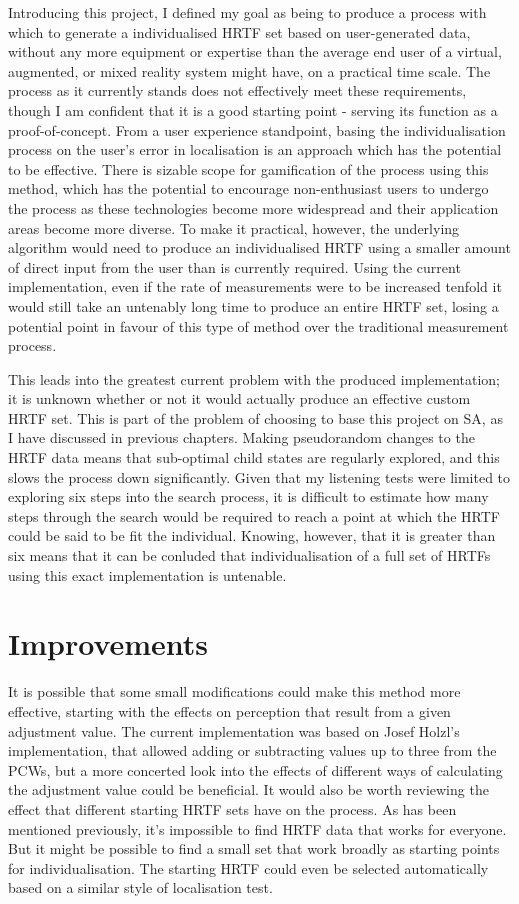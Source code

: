 Introducing this project, I defined my goal as being to produce a process with which to generate a individualised HRTF set based on user-generated data, without any more equipment or expertise than the average end user of a virtual, augmented, or mixed reality system might have, on a practical time scale. The process as it currently stands does not effectively meet these requirements, though I am confident that it is a good starting point - serving its function as a proof-of-concept. From a user experience standpoint, basing the individualisation process on the user's error in localisation is an approach which has the potential to be effective. There is sizable scope for gamification of the process using this method, which has the potential to encourage non-enthusiast users to undergo the process as these technologies become more widespread and their application areas become more diverse. To make it practical, however, the underlying algorithm would need to produce an individualised HRTF using a smaller amount of direct input from the user than is currently required. Using the current implementation, even if the rate of measurements were to be increased tenfold it would still take an untenably long time to produce an entire HRTF set, losing a potential point in favour of this type of method over the traditional measurement process. 

This leads into the greatest current problem with the produced implementation; it is unknown whether or not it would actually produce an effective custom HRTF set. This is part of the problem of choosing to base this project on SA, as I have discussed in previous chapters. Making pseudorandom changes to the HRTF data means that sub-optimal child states are regularly explored, and this slows the process down significantly. Given that my listening tests were limited to exploring six steps into the search process, it is difficult to estimate how many steps through the search would be required to reach a point at which the HRTF could be said to be fit the individual. Knowing, however, that it is greater than six means that it can be conluded that individualisation of a full set of HRTFs using this exact implementation is untenable.

\section{Improvements}

It is possible that some small modifications could make this method more effective, starting with the effects on perception that result from a given adjustment value. The current implementation was based on Josef Holzl's implementation\citep{Holzl2014}, that allowed adding or subtracting values up to three from the PCWs, but a more concerted look into the effects of different ways of calculating the adjustment value could be beneficial. It would also be worth reviewing the effect that different starting HRTF sets have on the process. As has been mentioned previously, it's impossible to find HRTF data that works for everyone. But it might be possible to find a small set that work broadly as starting points for individualisation. The starting HRTF could even be selected automatically based on a similar style of localisation test. 

